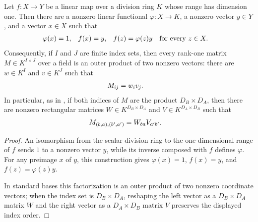 \begin{lemma}
    \label{thm:rank_one_factorizations}
    \leanok
    Let $f\colon X\to Y$ be a linear map over a division ring $K$ whose range
    has dimension one.  Then there are a nonzero linear functional
    $\varphi\colon X\to K$, a nonzero vector $y\in Y$, and a vector $x\in X$
    such that
    \begin{align}
        \varphi(x) & =1, & f(x) & =y, & f(z) & =\varphi(z)y
        \quad\text{for every }z\in X.
        \notag
    \end{align}
    Consequently, if $I$ and $J$ are finite index sets, then every rank-one
    matrix $M\in K^{I\times J}$ over a field is an outer product of two
    nonzero vectors: there are $w\in K^I$ and $v\in K^J$ such that
    \begin{align}
        M_{ij} & =w_i v_j.
        \notag
    \end{align}
    In particular, as in
    \cite[proof of Proposition~20, lines~3866--3936]{Molnar2018SemiInjective},
    if both indices of $M$ are the product $D_B\times D_A$, then there are
    nonzero rectangular matrices $W\in K^{D_B\times D_A}$ and
    $V\in K^{D_A\times D_B}$ such that
    \begin{align}
        M_{(b,a),(b',a')}
         & =W_{ba}V_{a'b'}.
        \notag
    \end{align}
\end{lemma}

\begin{proof}
    \leanok
    An isomorphism from the scalar division ring to the one-dimensional range
    of $f$ sends $1$ to a nonzero vector $y$, while its inverse composed with
    $f$ defines $\varphi$.  For any preimage $x$ of $y$, this construction
    gives $\varphi(x)=1$, $f(x)=y$, and $f(z)=\varphi(z)y$.

    In standard bases this factorization is an outer product of two nonzero
    coordinate vectors; when the index set is $D_B\times D_A$, reshaping the
    left vector as a $D_B\times D_A$ matrix $W$ and the right vector as a
    $D_A\times D_B$ matrix $V$ preserves the displayed index order.
\end{proof}

